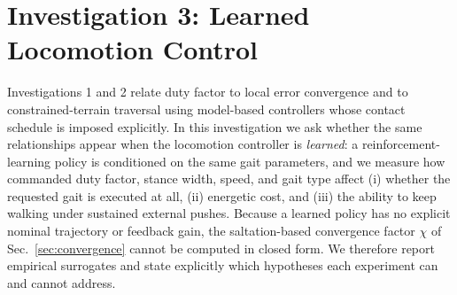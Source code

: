 %
%
%

\section{Investigation 3: Learned Locomotion Control}
\label{sec:inv3}

Investigations 1 and 2 relate duty factor to local error convergence and to
constrained-terrain traversal using model-based controllers whose contact
schedule is imposed explicitly. In this investigation we ask whether the same
relationships appear when the locomotion controller is \emph{learned}: a
reinforcement-learning policy is conditioned on the same gait parameters,
and we measure how commanded duty factor, stance width, speed, and gait type
affect (i) whether the requested gait is executed at all, (ii) energetic cost,
and (iii) the ability to keep walking under sustained external pushes. Because
a learned policy has no explicit nominal trajectory or feedback gain, the
saltation-based convergence factor $\chi$ of Sec.~\ref{sec:convergence} cannot
be computed in closed form. We therefore report empirical surrogates and state
explicitly which hypotheses each experiment can and cannot address.

